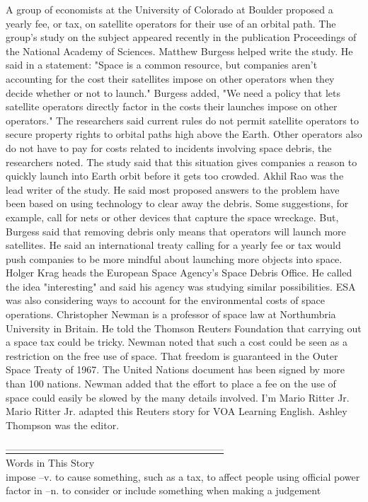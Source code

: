 A group of economists at the University of Colorado at Boulder proposed a yearly fee, or tax, on satellite operators for their use of an orbital path. The group's study on the subject appeared recently in the publication Proceedings of the National Academy of Sciences.
Matthew Burgess helped write the study. He said in a statement: "Space is a common resource, but companies aren't accounting for the cost their satellites impose on other operators when they decide whether or not to launch."
Burgess added, "We need a policy that lets satellite operators directly factor in the costs their launches impose on other operators."
The researchers said current rules do not permit satellite operators to secure property rights to orbital paths high above the Earth. Other operators also do not have to pay for costs related to incidents involving space debris, the researchers noted.
The study said that this situation gives companies a reason to quickly launch into Earth orbit before it gets too crowded.
Akhil Rao was the lead writer of the study. He said most proposed answers to the problem have been based on using technology to clear away the debris. Some suggestions, for example, call for nets or other devices that capture the space wreckage.
But, Burgess said that removing debris only means that operators will launch more satellites.
He said an international treaty calling for a yearly fee or tax would push companies to be more mindful about launching more objects into space.
Holger Krag heads the European Space Agency's Space Debris Office. He called the idea "interesting" and said his agency was studying similar possibilities. ESA was also considering ways to account for the environmental costs of space operations.
Christopher Newman is a professor of space law at Northumbria University in Britain. He told the Thomson Reuters Foundation that carrying out a space tax could be tricky.
Newman noted that such a cost could be seen as a restriction on the free use of space. That freedom is guaranteed in the Outer Space Treaty of 1967. The United Nations document has been signed by more than 100 nations.
Newman added that the effort to place a fee on the use of space could easily be slowed by the many details involved.
I'm Mario Ritter Jr.
Mario Ritter Jr. adapted this Reuters story for VOA Learning English. Ashley Thompson was the editor.

\underline{------------------------------------------------------------------} \\

Words in This Story \\
impose –v. to cause something, such as a tax, to affect people using official power \\
factor in –n. to consider or include something when making a judgement \\
